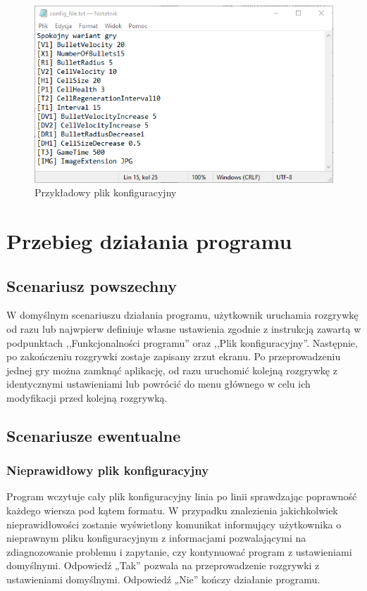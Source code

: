\documentclass[11pt,a4paper]{report}
\begin{document}
\begin{figure}[!ht]
\centerline{\includegraphics{img/config_example.png}}
\caption{Przykładowy plik konfiguracyjny}
\end{figure}

\section{Przebieg działania programu}
\subsection {Scenariusz powszechny}
W domyślnym scenariuszu działania programu, użytkownik uruchamia rozgrywkę od razu lub najwpierw definiuje własne ustawienia zgodnie z instrukcją zawartą w podpunktach ,,Funkcjonalności programu'' oraz ,,Plik konfiguracyjny''. Następnie, po zakończeniu rozgrywki zostaje zapisany zrzut ekranu. Po przeprowadzeniu jednej gry można zamknąć aplikację, od razu uruchomić kolejną rozgrywkę z identycznymi ustawieniami lub powrócić do menu głównego w celu ich modyfikacji przed kolejną rozgrywką.

\subsection {Scenariusze ewentualne}
\subsubsection{Nieprawidłowy plik konfiguracyjny}
Program wczytuje cały plik konfiguracyjny linia po linii sprawdzając poprawność każdego wiersza pod kątem formatu. W przypadku znalezienia jakichkolwiek nieprawidłowości zostanie wyświetlony komunikat informujący użytkownika o nieprawnym pliku konfiguracyjnym z informacjami pozwalającymi na zdiagnozowanie problemu i zapytanie, czy kontynuować program z ustawieniami domyślnymi. Odpowiedź „Tak” pozwala na przeprowadzenie rozgrywki z ustawieniami domyślnymi. Odpowiedź „Nie” kończy działanie programu.
\end{document}
